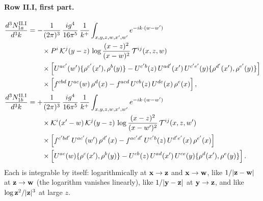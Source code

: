 \paragraph{Row II.I, first part.}
\begin{align}\label{eq:app_III1a}
\frac{d^3N^{\rm II.I}_{1a}}{d^3k}&=-\frac{1}{(2\pi)^3}\,\frac{ig^4}{16\pi^5}\,\frac{1}{k^+}\int_{x,y,z,w,x',w'}e^{-ik\cdot(w-w')}\notag\\&\qquad\times P^i\,\mathcal{K}^j(y-z)\,\log\frac{(x-z)^2}{(x-w)^2}\,\mathcal T^{ij}(x,z,w)\notag\\
&\qquad\times\Big[U^{ac'}(w')\{\rho^{c'}(x'),\rho^b(y)\}-U^{c'b}(z)\,U^{ad'}(x')\,U^{c'e'}(y)\{\rho^{d'}(x'),\rho^{e'}(y)\}\Big]\notag\\
&\qquad\times\Big[f^{cbd}\,U^{ac}(w)\,\rho^d(x)-f^{acd}\,U^{cb}(z)\,U^{de}(x)\,\rho^e(x)\Big]\,,\\
\label{eq:app_III1b}
\frac{d^3N^{\rm II.I}_{1b}}{d^3k}&=+\frac{1}{(2\pi)^3}\,\frac{ig^4}{16\pi^5}\,\frac{1}{k^+}\int_{x,y,z,w,x',w'}e^{-ik\cdot(w-w')}\notag\\&\qquad\times\mathcal{K}^i(x'-w)\,\mathcal{K}^j(y-z)\,\log\frac{(x-z)^2}{(x-w')^2}\,\mathcal T^{ij}(x,z,w')\notag\\
&\qquad\times\Big[f^{c'bd'}\,U^{ac'}(w')\,\rho^{d'}(x)-f^{ac'd'}\,U^{c'b}(z)\,U^{d'e'}(x)\,\rho^{e'}(x)\Big]\notag\\
&\qquad\times\Big[U^{ac}(w)\{\rho^c(x'),\rho^b(y)\}-U^{cb}(z)\,U^{ad}(x')\,U^{ce}(y)\{\rho^d(x'),\rho^e(y)\}\Big]\,.
\end{align}
Each is integrable by itself: logarithmically at $\mathbf{x}\to\mathbf{z}$ and $\mathbf{x}\to\mathbf{w}$, like $1/|\mathbf{z}-\mathbf{w}|$ at $\mathbf{z}\to\mathbf{w}$ (the logarithm vanishes linearly), like $1/|\mathbf{y}-\mathbf{z}|$ at $\mathbf{y}\to\mathbf{z}$, and like $\log\mathbf{z}^2/|\mathbf{z}|^3$ at large $z$.

